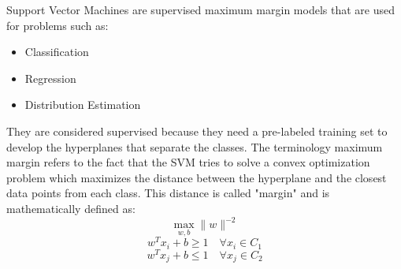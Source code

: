 Support Vector Machines are supervised maximum margin models that are used for problems such as:
\begin{itemize}
    \item Classification
    \item Regression
    \item Distribution Estimation
\end{itemize}
They are considered supervised because they need a pre-labeled training set to develop 
the hyperplanes that separate the classes. The terminology maximum margin refers to the
fact that the SVM tries to solve a convex optimization problem which maximizes the 
distance between the hyperplane and the closest data points from each class. This 
distance is called "margin" and is mathematically defined as:
\begin{equation}
    \max_{w, b}{\|w\|^{-2}}
\end{equation}
\begin{equation}
    w^Tx_i + b \geq 1 \quad \forall x_i \in C_1
\end{equation}
\begin{equation}
    w^Tx_j + b \leq 1 \quad \forall x_j \in C_2
\end{equation}

